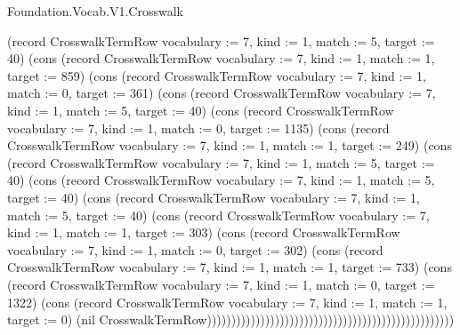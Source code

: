 \begin{lexlean}{Foundation.Vocab.V1.Crosswalk}
\begin{semanticmodule}
{(record CrosswalkTermRow {vocabulary := 7, kind := 1, match := 5, target := 40}) (cons (record CrosswalkTermRow {vocabulary := 7, kind := 1, match := 1, target := 859}) (cons (record CrosswalkTermRow {vocabulary := 7, kind := 1, match := 0, target := 361}) (cons (record CrosswalkTermRow {vocabulary := 7, kind := 1, match := 5, target := 40}) (cons (record CrosswalkTermRow {vocabulary := 7, kind := 1, match := 0, target := 1135}) (cons (record CrosswalkTermRow {vocabulary := 7, kind := 1, match := 1, target := 249}) (cons (record CrosswalkTermRow {vocabulary := 7, kind := 1, match := 5, target := 40}) (cons (record CrosswalkTermRow {vocabulary := 7, kind := 1, match := 5, target := 40}) (cons (record CrosswalkTermRow {vocabulary := 7, kind := 1, match := 5, target := 40}) (cons (record CrosswalkTermRow {vocabulary := 7, kind := 1, match := 1, target := 303}) (cons (record CrosswalkTermRow {vocabulary := 7, kind := 1, match := 0, target := 302}) (cons (record CrosswalkTermRow {vocabulary := 7, kind := 1, match := 1, target := 733}) (cons (record CrosswalkTermRow {vocabulary := 7, kind := 1, match := 0, target := 1322}) (cons (record CrosswalkTermRow {vocabulary := 7, kind := 1, match := 1, target := 0}) (nil CrosswalkTermRow)))))))))))))))))))))))))))))))))))))))))))))))))))
}


\end{semanticmodule}
\end{lexlean}
